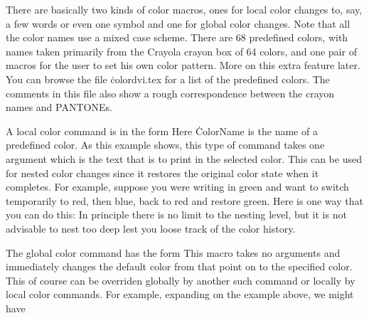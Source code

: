 There are basically two kinds of color macros, ones for local color
changes to, say, a few words or even one symbol and one for global
color changes.  Note that all the color names use a mixed case scheme.
There are 68 predefined colors, with names taken primarily from the
Crayola crayon box of 64 colors, and one pair of macros for the user
to set his own color pattern.  More on this extra feature later. You
can browse the file \.{colordvi.tex} for a list of the predefined colors.
The comments in this file also show a rough correspondence between the
crayon names and PANTONEs.

A local color command is in the form
\noindent
Here \.{ColorName} is the name of a predefined color. As this example
shows, this type of command takes one argument which is the text that
is to print in the selected color.  This can be used for nested color
changes since it restores the original color state when it completes.
For example, suppose you were writing in green and want to switch
temporarily to red, then blue, back to red and restore green.  Here is
one way that you can do this:
\noindent
In principle there is no limit to the nesting level, but it is not
advisable to nest too deep lest you loose track of the color history.
 
The global color command has the form
\noindent 
This macro takes no arguments and immediately changes the default
color from that point on to the specified color. This of course can be
overriden globally by another such command or locally by local color
commands. For example, expanding on the example above, we might have
 
